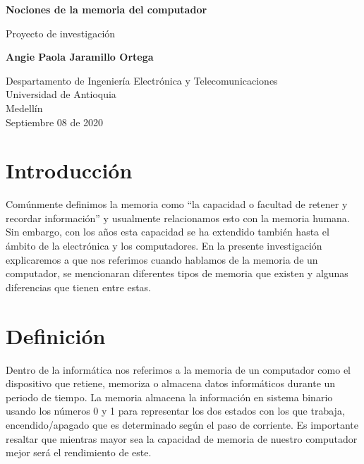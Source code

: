 \documentclass{article}
\begin{document}
\begin{titlepage}
    \begin{center}
        \vspace*{1cm}
            
        \Huge
        \textbf{Nociones de la memoria del computador}
            
        \vspace{0.5cm}
        \LARGE
        Proyecto de investigación
            
        \vspace{1.5cm}
            
        \textbf{Angie Paola Jaramillo Ortega}
            
        \vfill
            
        \vspace{0.8cm}
            
        \Large
        Despartamento de Ingeniería Electrónica y Telecomunicaciones\\
        Universidad de Antioquia\\
        Medellín\\
        Septiembre 08 de 2020
            
    \end{center}
\end{titlepage}

\tableofcontents
\newpage

\section{Introducción}
Comúnmente definimos la memoria como “la capacidad o facultad de retener y recordar información”\cite{definicion} y usualmente relacionamos esto con la memoria humana. Sin embargo, con los años esta capacidad se ha extendido también hasta el ámbito de la electrónica y los computadores. En la presente investigación explicaremos a que nos referimos cuando hablamos de la memoria de un computador, se mencionaran diferentes tipos de memoria que existen y algunas diferencias que tienen entre estas.


\section{Definición}
Dentro de la informática nos referimos a la memoria de un computador como el dispositivo que retiene, memoriza o almacena datos informáticos durante un periodo de tiempo. La memoria almacena la información en sistema binario usando los números 0 y 1 para representar los dos estados con los que trabaja, encendido/apagado que es determinado según el paso de corriente. Es importante resaltar que mientras mayor sea la capacidad de memoria de nuestro computador mejor será el rendimiento de este.
\end{document}
